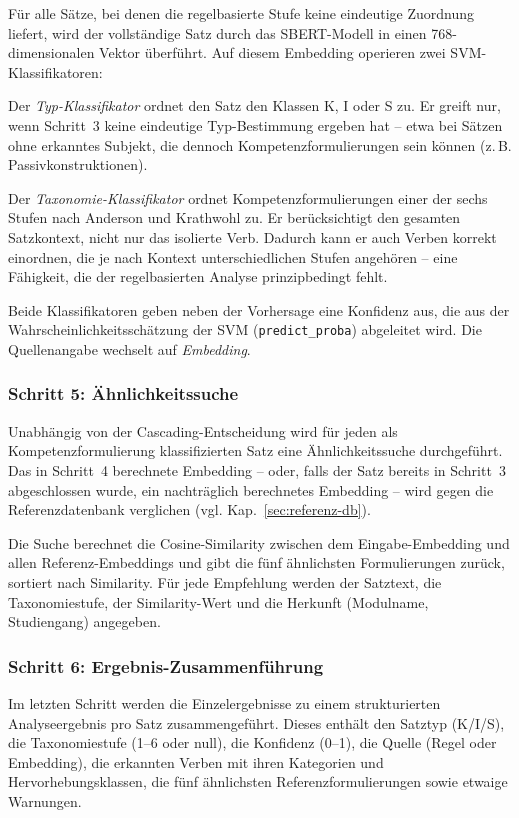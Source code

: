 Für alle Sätze, bei denen die regelbasierte Stufe keine eindeutige Zuordnung liefert, wird der vollständige Satz durch das SBERT-Modell in einen 768-dimensionalen Vektor überführt.
Auf diesem Embedding operieren zwei SVM-Klassifikatoren:

Der \emph{Typ-Klassifikator} ordnet den Satz den Klassen K, I oder S zu.
Er greift nur, wenn Schritt~3 keine eindeutige Typ-Bestimmung ergeben hat -- etwa bei Sätzen ohne erkanntes Subjekt, die dennoch Kompetenzformulierungen sein können (z.\,B. Passivkonstruktionen).

Der \emph{Taxonomie-Klassifikator} ordnet Kompetenzformulierungen einer der sechs Stufen nach Anderson und Krathwohl zu.
Er berücksichtigt den gesamten Satzkontext, nicht nur das isolierte Verb.
Dadurch kann er auch Verben korrekt einordnen, die je nach Kontext unterschiedlichen Stufen angehören -- eine Fähigkeit, die der regelbasierten Analyse prinzipbedingt fehlt.

Beide Klassifikatoren geben neben der Vorhersage eine Konfidenz aus, die aus der Wahrscheinlichkeitsschätzung der SVM (\texttt{predict\_proba}) abgeleitet wird.
Die Quellenangabe wechselt auf \emph{Embedding}.

\subsubsection{Schritt 5: Ähnlichkeitssuche}\label{sec:aehnlichkeitssuche}

Unabhängig von der Cascading-Entscheidung wird für jeden als Kompetenzformulierung klassifizierten Satz eine Ähnlichkeitssuche durchgeführt.
Das in Schritt~4 berechnete Embedding -- oder, falls der Satz bereits in Schritt~3 abgeschlossen wurde, ein nachträglich berechnetes Embedding -- wird gegen die Referenzdatenbank verglichen (vgl. Kap.~\ref{sec:referenz-db}).

Die Suche berechnet die Cosine-Similarity zwischen dem Eingabe-Embedding und allen Referenz-Embeddings und gibt die fünf ähnlichsten Formulierungen zurück, sortiert nach Similarity.
Für jede Empfehlung werden der Satztext, die Taxonomiestufe, der Similarity-Wert und die Herkunft (Modulname, Studiengang) angegeben.

\subsubsection{Schritt 6: Ergebnis-Zusammenführung}\label{sec:zusammenfuehrung}

Im letzten Schritt werden die Einzelergebnisse zu einem strukturierten Analyseergebnis pro Satz zusammengeführt.
Dieses enthält den Satztyp (K/I/S), die Taxonomiestufe (1--6 oder null), die Konfidenz (0--1), die Quelle (Regel oder Embedding), die erkannten Verben mit ihren Kategorien und Hervorhebungsklassen, die fünf ähnlichsten Referenzformulierungen sowie etwaige Warnungen.

